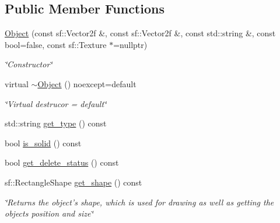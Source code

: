 \subsection*{Public Member Functions}
\begin{DoxyCompactItemize}
\item 
\hyperlink{classObject_a2df3d89d7e56659a1a0bc22d5019d587}{Object} (const sf\+::\+Vector2f \&, const sf\+::\+Vector2f \&, const std\+::string \&, const bool=false, const sf\+::\+Texture $\ast$=nullptr)
\begin{DoxyCompactList}\small\item\em \char`\"{}\+Constructor\char`\"{} \end{DoxyCompactList}\item 
\hypertarget{classObject_ad405a082a0ef9a641cd5b83ff6dd33c0}{virtual \hyperlink{classObject_ad405a082a0ef9a641cd5b83ff6dd33c0}{$\sim$\+Object} () noexcept=default}\label{classObject_ad405a082a0ef9a641cd5b83ff6dd33c0}

\begin{DoxyCompactList}\small\item\em \char`\"{}\+Virtual destrucor = default\char`\"{} \end{DoxyCompactList}\item 
std\+::string \hyperlink{classObject_a19738c1d7a0f32703a61412906edb04f}{get\+\_\+type} () const 
\item 
bool \hyperlink{classObject_ae132d029eeaaa8e3d4660951e0a35ad8}{is\+\_\+solid} () const 
\item 
bool \hyperlink{classObject_a98541d2f7380e4b5d6c805bbd7aaab01}{get\+\_\+delete\+\_\+status} () const 
\item 
sf\+::\+Rectangle\+Shape \hyperlink{classObject_a15e719bf3122cf4d8333a2b8b2f18471}{get\+\_\+shape} () const 
\begin{DoxyCompactList}\small\item\em \char`\"{}\+Returns the object's shape, which is used for drawing as well
        as getting the objects position and size\char`\"{} \end{DoxyCompactList}\end{DoxyCompactItemize}

